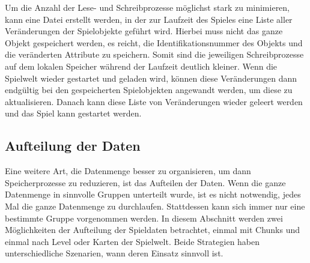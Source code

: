 Um die Anzahl der Lese- und Schreibprozesse möglichst stark zu minimieren, kann eine Datei erstellt werden, in der zur Laufzeit des Spieles eine Liste aller Veränderungen der Spielobjekte geführt wird. Hierbei muss nicht das ganze Objekt gespeichert werden, es reicht, die Identifikationsnummer des Objekts und die veränderten Attribute zu speichern. Somit sind die jeweiligen Schreibprozesse auf dem lokalen Speicher während der Laufzeit deutlich kleiner. Wenn die Spielwelt wieder gestartet und geladen wird, können diese Veränderungen dann endgültig bei den gespeicherten Spielobjekten angewandt werden, um diese zu aktualisieren. Danach kann diese Liste von Veränderungen wieder geleert werden und das Spiel kann gestartet werden.


\subsection{Aufteilung der Daten} 
Eine weitere Art, die Datenmenge besser zu organisieren, um dann Speicherprozesse zu reduzieren, ist das Aufteilen der Daten. Wenn die ganze Datenmenge in sinnvolle Gruppen unterteilt wurde, ist es nicht notwendig, jedes Mal die ganze Datenmenge zu durchlaufen. Stattdessen kann sich immer nur eine bestimmte Gruppe vorgenommen werden. In diesem Abschnitt werden zwei Möglichkeiten der Aufteilung der Spieldaten betrachtet, einmal mit Chunks und einmal nach Level oder Karten der Spielwelt. Beide Strategien haben unterschiedliche Szenarien, wann deren Einsatz sinnvoll ist.

